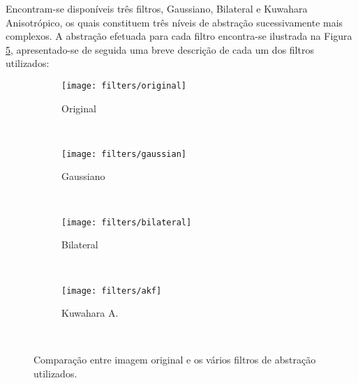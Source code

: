 Encontram-se disponíveis três filtros, Gaussiano, Bilateral e Kuwahara Anisotrópico, os quais constituem três níveis de abstração sucessivamente mais complexos. A abstração efetuada para cada filtro encontra-se ilustrada na Figura \ref{fig:filters}, apresentado-se de seguida uma breve descrição de cada um dos filtros utilizados:

\begin{figure}[t]
        \centering
        \begin{subfigure}[b]{0.2\textwidth}
                \centering
                \texttt{[image: filters/original]}
                \caption{Original}
                \label{fig:filters-original}
        \end{subfigure}%
        ~
        \begin{subfigure}[b]{0.2\textwidth}
                \centering
                \texttt{[image: filters/gaussian]}
                \caption{Gaussiano}
                \label{fig:filters-gaussian}
        \end{subfigure}
        ~ 
        \begin{subfigure}[b]{0.2\textwidth}
                \centering
                \texttt{[image: filters/bilateral]}
                \caption{Bilateral}
                \label{fig:filters-bilateral}
        \end{subfigure}
        ~
        \begin{subfigure}[b]{0.2\textwidth}
                \centering
                \texttt{[image: filters/akf]}
                \caption{Kuwahara A.}
                \label{fig:filters-kuwahara}
        \end{subfigure}
        ~ 
        \caption{Comparação entre imagem original e os vários filtros de abstração utilizados.}\label{fig:filters}
\end{figure}

